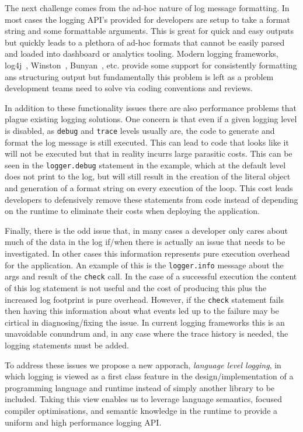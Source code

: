 \documentclass[preprint]{sig-alternate-05-2015}
\begin{document}
The next challenge comes from the ad-hoc nature of log message formatting. In
most cases the logging API's provided for developers are setup to take a format
string and some formattable arguments. This is great for quick and easy outputs
but quickly leads to a plethora of ad-hoc formats that cannot be easily parsed
and loaded into dashboard or analytics tooling. Modern logging frameworks,
log4j~\cite{log4j}, Winston~\cite{Winston}, Bunyan~\cite{Bunyan}, etc. provide
some support for consistently formatting ans structuring output but
fundamentally this problem is left as a problem development teams need to solve
via coding conventions and reviews.

In addition to these functionality issues there are also performance problems
that plague existing logging solutions. One concern is that even if a given
logging level is disabled, as \texttt{debug} and \texttt{trace} levels usually
are, the code to generate and format the log message is still executed. This can
lead to code that looks like it will not be executed but that in reality incurrs
large parasitic costs. This can be seen in the \texttt{logger.debug} statement
in the example, which at the default level does not print to the log, but will
still result in the creation of the literal object and generation of a format
string on every execution of the loop. This cost leads developers to defensively
remove these statements from code instead of depending on the runtime to
eliminate their costs when deploying the application.

Finally, there is the odd issue that, in many cases a developer only cares about
much of the data in the log if/when there is actually an issue that needs to be
investigated. In other cases this information represents pure execution overhead
for the application. An example of this is the \texttt{logger.info} message
about the args and result of the \texttt{check} call. In the case of a
successful execution the content of this log statement is not useful and the
cost of producing this plus the increased log footprint is pure overhead.
However, if the \texttt{check} statement fails then having this information
about what events led up to the failure may be cirtical in diagnosing/fixing the
issue. In current logging frameworks this is an unavoidable conundrum and, in
any case where the trace history is needed, the logging statements must be
added.

To address these issues we propose a new apporach, \emph{language level
logging}, in which logging is viewed as a first class feature in the
design/implementation of a programming language and runtime instead of simply
another library to be included. Taking this view enables us to leverage language
semantics, focused compiler optimisations, and semantic knowledge in the runtime
to provide a uniform and high performance logging API.
\end{document}
